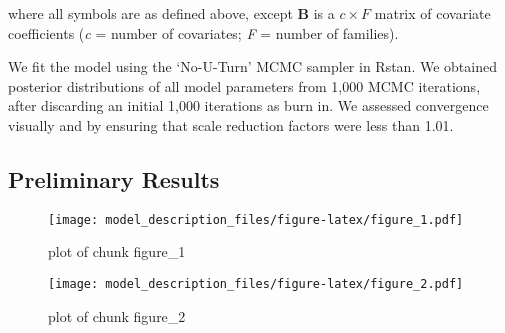 \documentclass[12pt,]{article}
\begin{document}
where all symbols are as defined above, except \textbf{B} is a
\(c \times F\) matrix of covariate coefficients (\emph{c} = number of
covariates; \emph{F} = number of families).

We fit the model using the `No-U-Turn' MCMC sampler in Rstan. We
obtained posterior distributions of all model parameters from 1,000 MCMC
iterations, after discarding an initial 1,000 iterations as burn in. We
assessed convergence visually and by ensuring that scale reduction
factors were less than 1.01.

\subsection{Preliminary Results}\label{preliminary-results}

\begin{figure}[htbp]
\centering
\texttt{[image: model\_description\_files/figure-latex/figure\_1.pdf]}
\caption{plot of chunk figure\_1}
\end{figure}

\begin{figure}[htbp]
\centering
\texttt{[image: model\_description\_files/figure-latex/figure\_2.pdf]}
\caption{plot of chunk figure\_2}
\end{figure}
\end{document}
